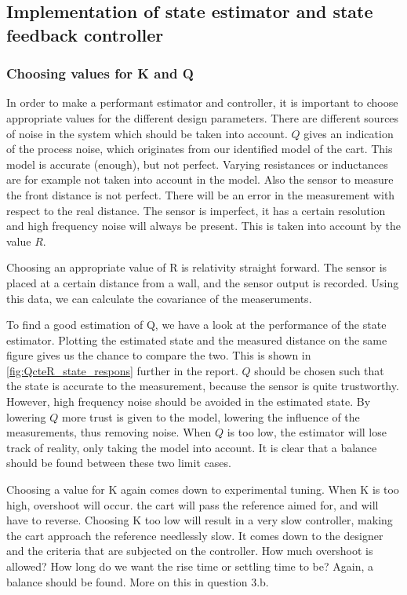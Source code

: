 \documentclass[a4paper]{article}
\newcommand{\newpar}{\vspace{.3cm}\noindent}
\begin{document}
\subsection{Implementation of state estimator and state feedback controller}
\subsubsection{Choosing values for K and Q}

In order to make a performant estimator and controller, it is important to choose appropriate values for the different design parameters. There are different sources of noise in the system which should be taken into account. $Q$ gives an indication of the process noise, which originates from our identified model of the cart. This model is accurate (enough), but not perfect. Varying resistances or inductances are for example not taken into account in the model. Also the sensor to measure the front distance is not perfect. There will be an error in the measurement with respect to the real distance. The sensor is imperfect, it has a certain resolution and high frequency noise will always be present. This is taken into account by the value $R$. 

\newpar
Choosing an appropriate value of R is relativity straight forward. The sensor is placed at a certain distance from a wall, and the sensor output is recorded. Using this data, we can calculate the covariance of the measeruments.

\newpar
To find a good estimation of Q, we have a look at the performance of the state estimator. Plotting the estimated state and the measured distance on the same figure gives us the chance to compare the two. This is shown in \autoref{fig:QcteR_state_respons} further in the report. $Q$ should be chosen such that the state is accurate to the measurement, because the sensor is quite trustworthy. However, high frequency noise should be avoided in the estimated state. By lowering $Q$ more trust is given to the model, lowering the influence of the measurements, thus removing noise. When $Q$ is too low, the estimator will lose track of reality, only taking the model into account. It is clear that a balance should be found between these two limit cases.

\newpar
Choosing a value for K again comes down to experimental tuning. When K is too high, overshoot will occur. the cart will pass the reference aimed for, and will have to reverse. Choosing K too low will result in a very slow controller, making the cart approach the reference needlessly slow. It comes down to the designer and the criteria that are subjected on the controller. How much overshoot is allowed? How long do we want the rise time or settling time to be? Again, a balance should be found. More on this in question 3.b. 
\end{document}
